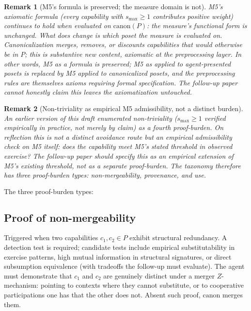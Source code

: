 \documentclass{article}
\newtheorem{remark}{Remark}
\newcommand{\canon}{\mathrm{canon}}
\begin{document}
\begin{remark}[M5's formula is preserved; the measure domain is
not]
\label{rem:m5_preserved}
M5's axiomatic formula (every capability with $s_{\max} \geq 1$
contributes positive weight) continues to hold when evaluated on
$\canon(P)$: the measure's functional form is unchanged.  What
does change is which poset the measure is evaluated on.
Canonicalization merges, removes, or discounts capabilities that
would otherwise be in $P$; this is substantive new content,
axiomatic at the preprocessing layer.  In other words, M5 as a
formula is preserved; M5 as applied to agent-presented posets is
replaced by M5 applied to canonicalized posets, and the
preprocessing rules are themselves axioms requiring formal
specification.  The follow-up paper cannot honestly claim this
leaves the axiomatization untouched.
\end{remark}

\begin{remark}[Non-triviality as empirical M5 admissibility, not
a distinct burden]
\label{rem:nontriv_not_burden}
An earlier version of this draft enumerated non-triviality
($s_{\max} \geq 1$ verified empirically in practice, not merely
by claim) as a fourth proof-burden.  On reflection this is not a
distinct avoidance route but an empirical admissibility check on
M5 itself: does the capability meet M5's stated threshold in
observed exercise?  The follow-up paper should specify this as
an empirical extension of M5's existing threshold, not as a
separate proof-burden.  The taxonomy therefore has three
proof-burden types: non-mergeability, provenance, and use.
\end{remark}

The three proof-burden types:

\subsection{Proof of non-mergeability}

Triggered when two capabilities $c_1, c_2 \in P$ exhibit
structural redundancy.  A detection test is required; candidate
tests include empirical substitutability in exercise patterns,
high mutual information in structural signatures, or direct
subsumption equivalence (with tradeoffs the follow-up must
evaluate).  The agent must demonstrate that $c_1$ and $c_2$ are
genuinely distinct under a merger $Z$-mechanism: pointing to
contexts where they cannot substitute, or to cooperative
participations one has that the other does not.  Absent such
proof, $\canon$ merges them.
\end{document}
